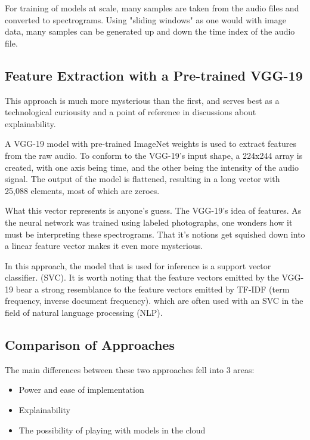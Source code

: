 \documentclass[sigconf]{acmart}
\begin{document}
For training of models at scale, many samples are taken from the audio files
and converted to spectrograms. Using "sliding windows" as one would with image data,
many samples can be generated up and down the time index of the audio file.

\subsection{Feature Extraction with a Pre-trained VGG-19}

This approach is much more mysterious than the first, and serves best
as a technological curiousity and a point of reference in discussions about
explainability.

A VGG-19 model with pre-trained ImageNet weights is used to extract
features from the raw audio. \cite{mahmood20} To conform to the VGG-19's
input shape, a 224x244 array is created, with one axis being time, and the
other being the intensity of the audio signal. The output of the model
is flattened, resulting in a long vector with 25,088 elements, most of which
are zeroes.

What this vector represents is anyone's guess. The VGG-19's idea of features.
As the neural network was trained using labeled photographs, one wonders
how it must be interpreting these spectrograms. That it's notions get squished 
down into a linear feature vector makes it even more mysterious.

In this approach, the model that is used for inference is a support vector
classifier. (SVC). It is worth noting that the feature vectors emitted by the
VGG-19 bear a strong resemblance to the feature vectors emitted by 
TF-IDF (term frequency, inverse document frequency). which are often used 
with an SVC in the field of natural
language processing (NLP).

\subsection{Comparison of Approaches}

The main differences between these two approaches fell into 3 areas:

\begin{itemize}
\item Power and ease of implementation
\item Explainability
\item The possibility of playing with models in the cloud
\end{itemize}
\end{document}
